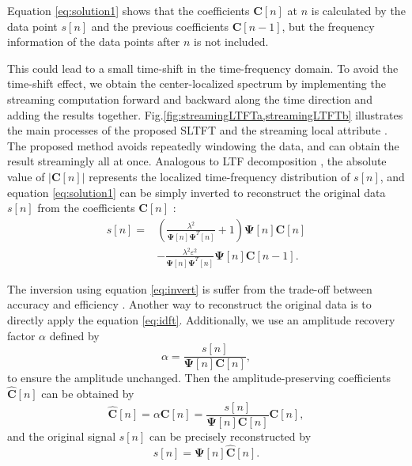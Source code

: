 Equation \ref{eq:solution1} shows that the coefficients
$\mathbf{C}[n]$ at $n$ is calculated by the data point $s[n]$ and the
previous coefficients $\mathbf{C}[n-1]$, but the frequency information
of the data points after $n$ is not included.

This could lead to a small time-shift in the time-frequency domain. To
avoid the time-shift effect, we obtain the center-localized spectrum
by implementing the streaming computation forward and backward along
the time direction and adding the results
together. Fig.\ref{fig:streamingLTFTa,streamingLTFTb} illustrates the
main processes of the proposed SLTFT and the streaming local
attribute \cite[]{Geng24}. The proposed method avoids repeatedly
windowing the data, and can obtain the result streamingly all at
once. Analogous to LTF decomposition \cite[]{Liu13}, the absolute
value of $|\mathbf{C}[n]|$ represents the localized time-frequency
distribution of $s[n]$, and equation \ref{eq:solution1} can be simply
inverted to reconstruct the original data $s[n]$ from the coefficients
$\mathbf{C}[n]$ \cite[]{Fomel16,Fomel24}:
\begin{equation}
	\label{eq:invert}
	\begin{aligned}
		s[n] =& \left( \frac{\lambda^2}{\mathbf{\Psi}[n]\mathbf{\Psi}^T[n]}+1\right)\mathbf{\Psi}[n]\mathbf{C}[n]\\
		&-\frac{\lambda^2\varepsilon^2}{\mathbf{\Psi}[n]\mathbf{\Psi}^T[n]}\mathbf{\Psi}[n]\mathbf{C}[n-1].
	\end{aligned}
\end{equation}

The inversion using equation \ref{eq:invert} is suffer from the
trade-off between accuracy and
efficiency \cite[]{Fomel16,Fomel24}. Another way to reconstruct the
original data is to directly apply the
equation \ref{eq:idft}. Additionally, we use an amplitude recovery
factor $\alpha$ defined by
\begin{equation}
	\label{eq:amp}
	\alpha = \frac{s[n]}{\mathbf{\Psi}[n]\mathbf{C}[n]},
\end{equation}
to ensure the amplitude unchanged. Then the amplitude-preserving
coefficients $\hat{\mathbf{C}}[n]$ can be obtained by
\begin{equation}
	\label{eq:acoeffs}
	\hat{\mathbf{C}}[n] = \alpha\mathbf{C}[n]=\frac{s[n]}{\mathbf{\Psi}[n]\mathbf{C}[n]}\mathbf{C}[n],
\end{equation}
and the original signal $s[n]$ can be precisely reconstructed by
\begin{equation}
	\label{eq:idft1}
	s[n] = \mathbf{\Psi}[n]\hat{\mathbf{C}}[n].
\end{equation}

